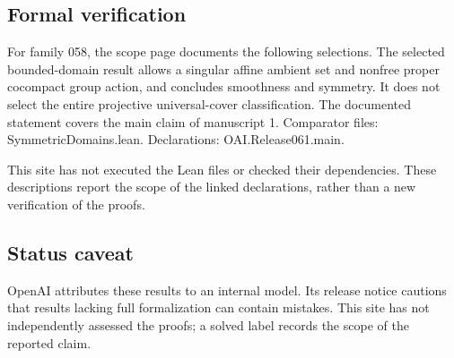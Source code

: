 \documentclass[11pt]{article}
\begin{document}
\subsection{Formal verification}
For family 058, the scope page documents the following selections. The selected bounded-domain result allows a singular affine ambient set and nonfree proper cocompact group action, and concludes smoothness and symmetry. It does not select the entire projective universal-cover classification. The documented statement covers the main claim of manuscript 1. Comparator files: SymmetricDomains.lean. Declarations: OAI.Release061.main.

This site has not executed the Lean files or checked their dependencies. These descriptions report the scope of the linked declarations, rather than a new verification of the proofs.

\subsection{Status caveat}
OpenAI attributes these results to an internal model. Its release notice cautions that results lacking full formalization can contain mistakes. This site has not independently assessed the proofs; a solved label records the scope of the reported claim.
\end{document}
